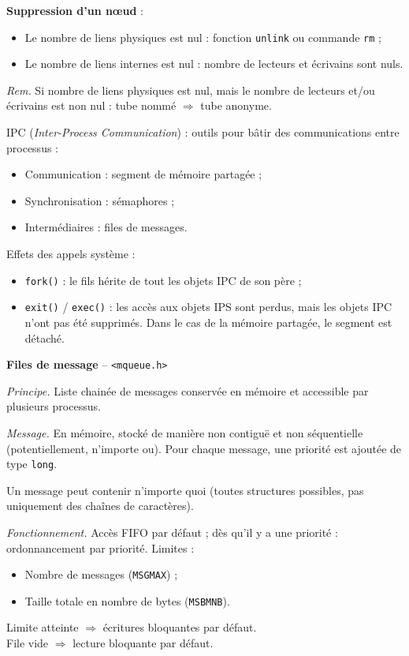 \documentclass[french]{scrartcl}
\begin{document}
\begin{multicols}{3}
\vskip 5pt
\textbf{Suppression d'un n\oe ud} :\begin{itemize}
	\item Le nombre de liens physiques est nul : fonction \lstinline!unlink! ou commande \lstinline!rm! ;
	\item Le nombre de liens internes est nul : nombre de lecteurs et écrivains sont nuls.
\end{itemize}
\emph{Rem.} Si nombre de liens physiques est nul, mais le nombre de lecteurs et/ou écrivains est non nul : tube nommé $\Rightarrow$ tube anonyme.

\clearpage   


IPC (\emph{Inter-Process Communication}) : outils pour bâtir des communications entre processus :
\begin{itemize}
	\item Communication : segment de mémoire partagée ;
	\item Synchronisation : sémaphores ; 
	\item Intermédiaires : files de messages.
\end{itemize}

Effets des appels système : 
\begin{itemize}
	\item \lstinline!fork()! : le fils hérite de tout les objets IPC de son père ;
	\item \lstinline!exit()! / \lstinline!exec()! : les accès aux objets IPS sont perdus, mais les objets IPC n'ont pas été supprimés. Dans le cas de la mémoire partagée, le segment est détaché.
\end{itemize}

\vskip 5pt
\textbf{Files de message} -- \lstinline!<mqueue.h>!

\emph{Principe.} Liste chainée de messages conservée en mémoire et accessible par plusieurs processus.

\vskip 2pt
\emph{Message.} En mémoire, stocké de manière non contiguë et non séquentielle (potentiellement, n'importe ou). Pour chaque message, une priorité est ajoutée de type \lstinline!long!.

Un message peut contenir n'importe quoi (toutes structures possibles, pas uniquement des chaînes de caractères).

\vskip 2pt
\emph{Fonctionnement.} Accès FIFO par défaut ; dès qu'il y a une priorité : ordonnancement par priorité. Limites : \begin{itemize}
	\item Nombre de messages (\lstinline!MSGMAX!) ;
	\item Taille totale en nombre de bytes (\lstinline!MSBMNB!).
\end{itemize} 
Limite atteinte $\Rightarrow$ écritures bloquantes par défaut.\\
File vide $\Rightarrow$ lecture bloquante par défaut.


\end{multicols}
\end{document}
